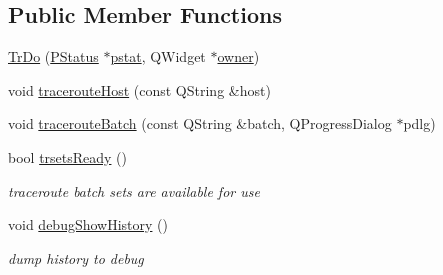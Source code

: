 \subsection*{Public Member Functions}
\begin{CompactItemize}
\item 
\hyperlink{classTrDo_c8608da0169aba638259ee2b5d8e93c2}{TrDo} (\hyperlink{classPStatus}{PStatus} $\ast$\hyperlink{classTrDo_55091c42eba7b183155e67793afb06e0}{pstat}, QWidget $\ast$\hyperlink{classTrDo_307c1b2dd82efb32f42ec5160676493e}{owner})
\item 
void \hyperlink{classTrDo_13b09aaa50b54aa250c327007232ef35}{tracerouteHost} (const QString \&host)
\item 
void \hyperlink{classTrDo_60f80f4c9d937ab0572d18f1a4e7d4f3}{tracerouteBatch} (const QString \&batch, QProgressDialog $\ast$pdlg)
\item 
bool \hyperlink{classTrDo_fe15575c4b2b447b064c833c25370dca}{trsetsReady} ()
\begin{CompactList}\small\item\em traceroute batch sets are available for use \item\end{CompactList}\item 
\hypertarget{classTrDo_396572dea95dde098b3d65cb98e9610c}{
void \hyperlink{classTrDo_396572dea95dde098b3d65cb98e9610c}{debugShowHistory} ()}
\label{classTrDo_396572dea95dde098b3d65cb98e9610c}

\begin{CompactList}\small\item\em dump history to debug \item\end{CompactList}\end{CompactItemize}
